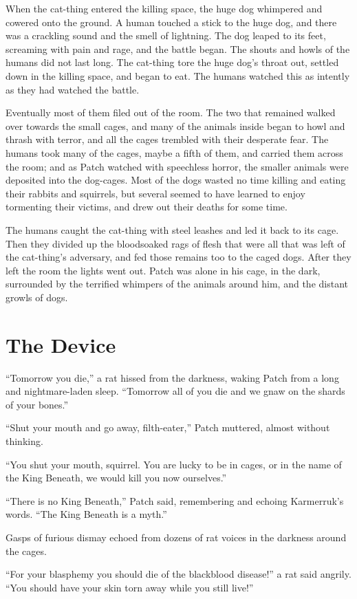 \documentclass[ebook,oneside,openany,17pt]{memoir}
\renewcommand{\thechapter}{\Roman{chapter}}
\newcounter{sections}
\newcommand{\sections}[1]{%
  \section*{#1}
  \addtocounter{sections}{1}%
  \pdfbookmark[1]{#1}{section.\thechapter.\thesections}}
\begin{document}
When the cat-thing entered the killing space, the huge dog whimpered
and cowered onto the ground. A human touched a stick to the huge dog,
and there was a crackling sound and the smell of lightning. The dog
leaped to its feet, screaming with pain and rage, and the battle
began. The shouts and howls of the humans did not last long. The
cat-thing tore the huge dog’s throat out, settled down in the killing
space, and began to eat. The humans watched this as intently as they
had watched the battle.

Eventually most of them filed out of the room. The two that remained
walked over towards the small cages, and many of the animals inside
began to howl and thrash with terror, and all the cages trembled with
their desperate fear. The humans took many of the cages, maybe a fifth
of them, and carried them across the room; and as Patch watched with
speechless horror, the smaller animals were deposited into the
dog-cages. Most of the dogs wasted no time killing and eating their
rabbits and squirrels, but several seemed to have learned to enjoy
tormenting their victims, and drew out their deaths for some time.

The humans caught the cat-thing with steel leashes and led it back to
its cage. Then they divided up the bloodsoaked rags of flesh that were
all that was left of the cat-thing’s adversary, and fed those remains
too to the caged dogs. After they left the room the lights went
out. Patch was alone in his cage, in the dark, surrounded by the
terrified whimpers of the animals around him, and the distant growls
of dogs.


\sections{The Device}

“Tomorrow you die,” a rat hissed from the darkness, waking Patch from
a long and nightmare-laden sleep. “Tomorrow all of you die and we gnaw
on the shards of your bones.”

“Shut your mouth and go away, filth-eater,” Patch muttered, almost
without thinking.

“You shut your mouth, squirrel. You are lucky to be in cages, or in
the name of the King Beneath, we would kill you now ourselves.”

“There is no King Beneath,” Patch said, remembering and echoing
Karmerruk’s words. “The King Beneath is a myth.”

Gasps of furious dismay echoed from dozens of rat voices in the
darkness around the cages.

“For your blasphemy you should die of the blackblood disease!” a rat
said angrily. “You should have your skin torn away while you still
live!”
\end{document}
